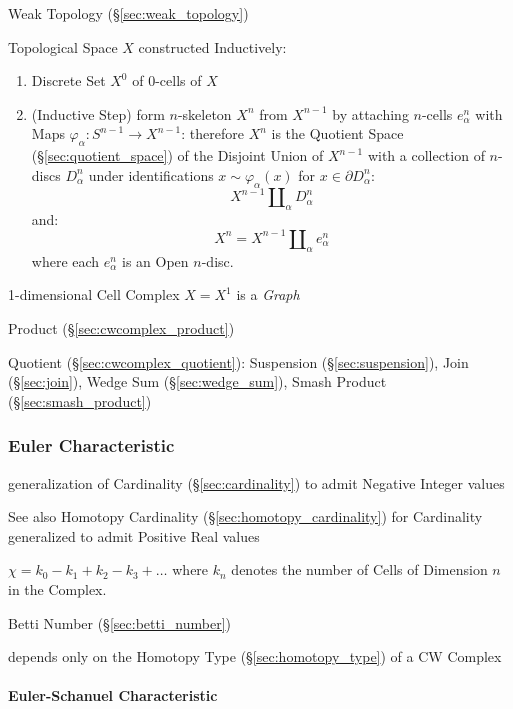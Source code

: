 Weak Topology (\S\ref{sec:weak_topology})

Topological Space $X$ constructed Inductively: \cite{hatcher02}
\begin{enumerate}
  \item Discrete Set $X^0$ of $0$-cells of $X$
  \item (Inductive Step) form $n$-skeleton $X^n$ from $X^{n-1}$ by
    attaching $n$-cells $e^n_\alpha$ with Maps $\varphi_\alpha :
    S^{n-1} \rightarrow X^{n-1}$: therefore $X^n$ is the Quotient
    Space (\S\ref{sec:quotient_space}) of the Disjoint Union of
    $X^{n-1}$ with a collection of $n$-discs $D^n_\alpha$ under
    identifications $x \sim \varphi_\alpha(x)$ for $x \in \partial
    D^n_\alpha$:
    \[
      X^{n-1}\amalg_\alpha D^n_\alpha
    \]
    and:
    \[
      X^n = X^{n-1}\amalg_\alpha e^n_\alpha
    \]
    where each $e^n_\alpha$ is an Open $n$-disc.
\end{enumerate}

1-dimensional Cell Complex $X = X^1$ is a \emph{Graph}

Product (\S\ref{sec:cwcomplex_product})

Quotient (\S\ref{sec:cwcomplex_quotient}): Suspension
(\S\ref{sec:suspension}), Join (\S\ref{sec:join}), Wedge Sum
(\S\ref{sec:wedge_sum}), Smash Product (\S\ref{sec:smash_product})



\subsubsection{Euler Characteristic}\label{sec:euler_characteristic}

generalization of Cardinality (\S\ref{sec:cardinality}) to admit
Negative Integer values

\fist See also Homotopy Cardinality (\S\ref{sec:homotopy_cardinality})
for Cardinality generalized to admit Positive Real values

$\chi = k_0 - k_1 + k_2 - k_3 + \ldots$ where $k_n$ denotes the number
of Cells of Dimension $n$ in the Complex.

Betti Number (\S\ref{sec:betti_number})

depends only on the Homotopy Type (\S\ref{sec:homotopy_type}) of a
CW Complex \cite{hatcher02}



\paragraph{Euler-Schanuel Characteristic}\label{sec:euler_schanuel}
\hfill

